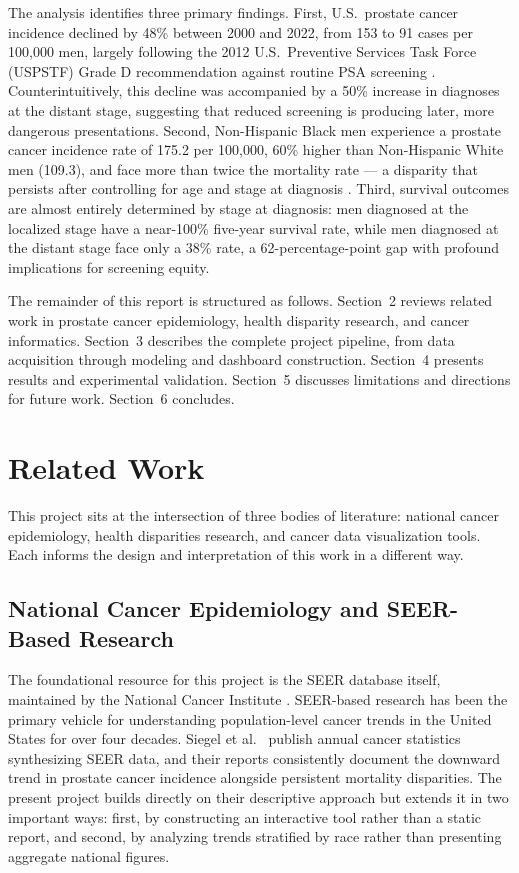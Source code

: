 \documentclass[12pt]{article}
\begin{document}
The analysis identifies three primary findings. First, U.S.\ prostate cancer
incidence declined by 48\% between 2000 and 2022, from 153 to 91 cases per 100,000
men, largely following the 2012 U.S.\ Preventive Services Task Force (USPSTF) Grade D
recommendation against routine PSA screening \cite{uspstf2012}. Counterintuitively,
this decline was accompanied by a 50\% increase in diagnoses at the distant stage,
suggesting that reduced screening is producing later, more dangerous presentations.
Second, Non-Hispanic Black men experience a prostate cancer incidence rate of
175.2 per 100,000, 60\% higher than Non-Hispanic White men (109.3), and face
more than twice the mortality rate --- a disparity that persists after controlling
for age and stage at diagnosis \cite{desantis2019}. Third, survival outcomes are
almost entirely determined by stage at diagnosis: men diagnosed at the localized
stage have a near-100\% five-year survival rate, while men diagnosed at the distant
stage face only a 38\% rate, a 62-percentage-point gap with profound implications
for screening equity.

The remainder of this report is structured as follows. Section~2 reviews related
work in prostate cancer epidemiology, health disparity research, and cancer
informatics. Section~3 describes the complete project pipeline, from data acquisition
through modeling and dashboard construction. Section~4 presents results and
experimental validation. Section~5 discusses limitations and directions for future
work. Section~6 concludes.

\section{Related Work}

This project sits at the intersection of three bodies of literature: national cancer
epidemiology, health disparities research, and cancer data visualization tools.
Each informs the design and interpretation of this work in a different way.

\subsection{National Cancer Epidemiology and SEER-Based Research}

The foundational resource for this project is the SEER database itself, maintained
by the National Cancer Institute \cite{seer2024}. SEER-based research has been the
primary vehicle for understanding population-level cancer trends in the United States
for over four decades. Siegel et al.\ \cite{siegel2023} publish annual cancer
statistics synthesizing SEER data, and their reports consistently document the
downward trend in prostate cancer incidence alongside persistent mortality disparities.
The present project builds directly on their descriptive approach but extends it in
two important ways: first, by constructing an interactive tool rather than a static
report, and second, by analyzing trends stratified by race rather than presenting
aggregate national figures.
\end{document}
